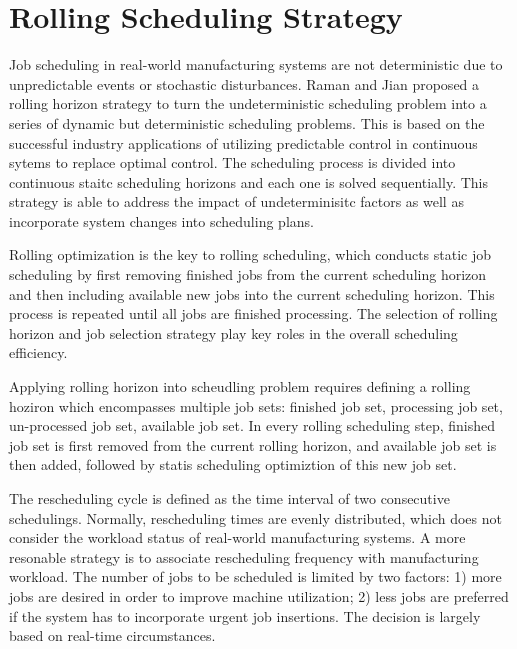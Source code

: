\section{Rolling Scheduling Strategy}
Job scheduling in real-world manufacturing systems are not deterministic due to unpredictable events or stochastic disturbances.
Raman \citep{raman19933} and Jian\citep{jian19972} proposed a rolling horizon strategy to turn the undeterministic scheduling problem into a series of dynamic but deterministic scheduling problems.
This is based on the successful industry applications of utilizing predictable control in continuous sytems to replace optimal control.
The scheduling process is divided into continuous staitc scheduling horizons and each one is solved sequentially.
This strategy is able to address the impact of undeterminisitc factors as well as incorporate system changes into scheduling plans.

Rolling optimization is the key to rolling scheduling, which conducts static job scheduling by first removing finished jobs from the current scheduling horizon and then including available new jobs into the current scheduling horizon.
This process is repeated until all jobs are finished processing.
The selection of rolling horizon and job selection strategy play key roles in the overall scheduling efficiency.

Applying rolling horizon into scheudling problem requires defining a rolling hoziron which encompasses multiple job sets: finished job set, processing job set, un-processed job set, available job set.
In every rolling scheduling step, finished job set is first removed from the current rolling horizon, and available job set is then added, followed by statis scheduling optimiztion of this new job set.

The rescheduling cycle is defined as the time interval of two consecutive schedulings.
Normally, rescheduling times are evenly distributed, which does not consider the workload status of real-world manufacturing systems.
A more resonable strategy is to associate rescheduling frequency with manufacturing workload.
The number of jobs to be scheduled is limited by two factors: 1) more jobs are desired in order to improve machine utilization; 2) less jobs are preferred if the system has to incorporate urgent job insertions.
The decision is largely based on real-time circumstances.


